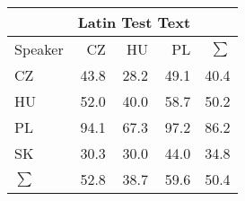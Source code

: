 \begin{tabular}{l|rrr|r}
\hline
 & \multicolumn{3}{c}{Latin Test Text} & \\
\hline
 Speaker   &   CZ &   HU &   PL &   $\sum$ \\
\hline
 CZ        & 43.8 & 28.2 & 49.1 &     40.4 \\
 HU        & 52.0 & 40.0 & 58.7 &     50.2 \\
 PL        & 94.1 & 67.3 & 97.2 &     86.2 \\
 SK        & 30.3 & 30.0 & 44.0 &     34.8 \\
\hline
 $\sum$   & 52.8 & 38.7 & 59.6 &     50.4 \\
\hline
\end{tabular}